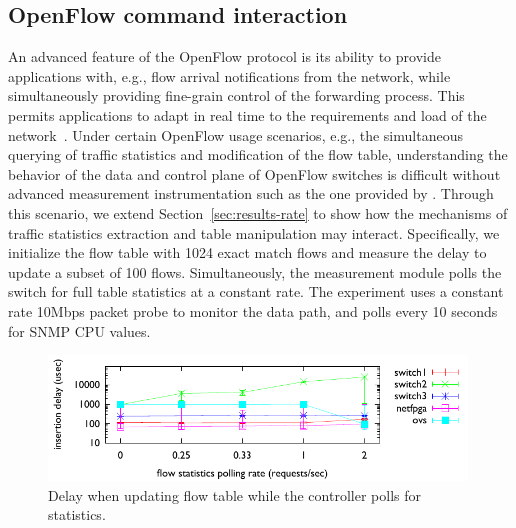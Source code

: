 \subsection{OpenFlow command interaction}\label{sec:results-interactions}


An advanced feature of the OpenFlow protocol is its ability to
provide applications with, e.g., flow arrival notifications from the 
network, while simultaneously providing fine-grain control of 
the forwarding process. This permits applications to adapt
in real time to the requirements and load of the
network~\cite{plug_n_serv,Yap09}. Under certain OpenFlow usage
scenarios, e.g., the simultaneous querying of traffic statistics and
modification of the flow table, understanding the behavior of the data
and control plane of OpenFlow switches is difficult without advanced
measurement instrumentation such as the one provided by \oflops. 
Through this scenario, we extend Section~\ref{sec:results-rate} to show 
how the mechanisms of traffic statistics extraction and table manipulation 
may interact. Specifically, we initialize the flow table with 1024 exact
match flows and measure the delay to update a subset of 100 flows. 
Simultaneously, the measurement module polls the switch for full table 
statistics at a constant rate. The experiment uses a constant rate 10Mbps 
packet probe to monitor the data path, and polls every 10 seconds for SNMP 
CPU values.

\begin{figure}[t!!]
  \begin{center}
    \includegraphics[width=0.99\textwidth]{interaction_test}
  \end{center}
  \caption{Delay when updating  flow table while the controller polls
    for statistics.}
  \label{fig:interaction_test}
\end{figure}

